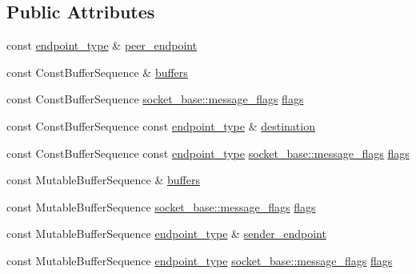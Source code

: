 \subsection*{Public Attributes}
\begin{DoxyCompactItemize}
\item 
const \hyperlink{classasio_1_1datagram__socket__service_a135b71c44f1e92b67cea4402f46578a9}{endpoint\+\_\+type} \& \hyperlink{classasio_1_1datagram__socket__service_ab24dc251be100ee0976e78abfe5946a3}{peer\+\_\+endpoint}
\item 
const Const\+Buffer\+Sequence \& \hyperlink{classasio_1_1datagram__socket__service_a8d5deea235095a9d82c4d36af00eaa0f}{buffers}
\item 
const Const\+Buffer\+Sequence \hyperlink{classasio_1_1socket__base_ac3cf77465dfedfe1979b5415cf32cc94}{socket\+\_\+base\+::message\+\_\+flags} \hyperlink{classasio_1_1datagram__socket__service_a4bb3745dcca72273467ef14d34819736}{flags}
\item 
const Const\+Buffer\+Sequence const \hyperlink{classasio_1_1datagram__socket__service_a135b71c44f1e92b67cea4402f46578a9}{endpoint\+\_\+type} \& \hyperlink{classasio_1_1datagram__socket__service_ae9f85315015dd493ef24676bbb633eda}{destination}
\item 
const Const\+Buffer\+Sequence const \hyperlink{classasio_1_1datagram__socket__service_a135b71c44f1e92b67cea4402f46578a9}{endpoint\+\_\+type} \hyperlink{classasio_1_1socket__base_ac3cf77465dfedfe1979b5415cf32cc94}{socket\+\_\+base\+::message\+\_\+flags} \hyperlink{classasio_1_1datagram__socket__service_a2ede5958ea4b94d38d693bbf27125c96}{flags}
\item 
const Mutable\+Buffer\+Sequence \& \hyperlink{classasio_1_1datagram__socket__service_a2f09f91392522c3350176e4c46aec02a}{buffers}
\item 
const Mutable\+Buffer\+Sequence \hyperlink{classasio_1_1socket__base_ac3cf77465dfedfe1979b5415cf32cc94}{socket\+\_\+base\+::message\+\_\+flags} \hyperlink{classasio_1_1datagram__socket__service_a30abe6af52922679cdbb1aae33c309d4}{flags}
\item 
const Mutable\+Buffer\+Sequence \hyperlink{classasio_1_1datagram__socket__service_a135b71c44f1e92b67cea4402f46578a9}{endpoint\+\_\+type} \& \hyperlink{classasio_1_1datagram__socket__service_a5bfcc5dd1de590bc5c55e0c19db18773}{sender\+\_\+endpoint}
\item 
const Mutable\+Buffer\+Sequence \hyperlink{classasio_1_1datagram__socket__service_a135b71c44f1e92b67cea4402f46578a9}{endpoint\+\_\+type} \hyperlink{classasio_1_1socket__base_ac3cf77465dfedfe1979b5415cf32cc94}{socket\+\_\+base\+::message\+\_\+flags} \hyperlink{classasio_1_1datagram__socket__service_a6d1830e4b29ea3232632dbeafad591d6}{flags}
\end{DoxyCompactItemize}
